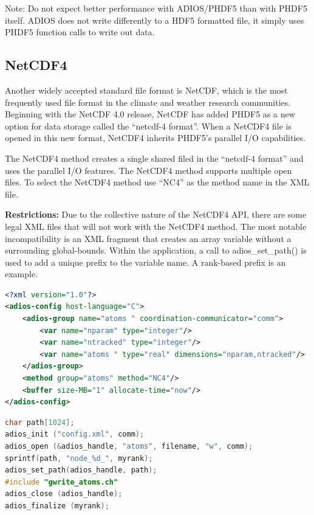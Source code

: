 Note: Do not expect better performance with ADIOS/PHDF5 than with PHDF5 itself. ADIOS does not write differently to a HDF5 formatted file, it simply uses PHDF5 function calls to write out data. 


\subsection{NetCDF4}

Another widely accepted standard file format is NetCDF, which is the most frequently 
used file format in the climate and weather research communities.  Beginning with 
the NetCDF 4.0 release, NetCDF has added PHDF5 as a new option for data storage 
called the ``netcdf-4 format''.  When a NetCDF4 file is opened in this new format, 
NetCDF4 inherits PHDF5's parallel I/O capabilities.

The NetCDF4 method creates a single shared filed in the ``netcdf-4 format'' and 
uses the parallel I/O features.  The NetCDF4 method supports multiple open files. 
 To select the NetCDF4 method use ``NC4'' as the method name in the XML file.

\textbf{Restrictions:} Due to the collective nature of the NetCDF4 API, there are 
some legal XML files that will not work with the NetCDF4 method.  The most notable 
incompatibility is an XML fragment that creates an array variable without a surrounding 
global-bounds.  Within the application, a call to adios\_set\_path() is used to 
add a unique prefix to the variable name.  A rank-based prefix is an example. 

\begin{lstlisting}[language=XML, caption=Example XML]
<?xml version="1.0"?> 
<adios-config host-language="C">
	<adios-group name="atoms " coordination-communicator="comm"> 
		<var name="nparam" type="integer"/>
		<var name="ntracked" type="integer"/>
		<var name="atoms " type="real" dimensions="nparam,ntracked"/> 
	</adios-group>
	<method group="atoms" method="NC4"/> 
	<buffer size-MB="1" allocate-time="now"/> 
</adios-config>
\end{lstlisting}

\begin{lstlisting}[language=C, caption=Example C source]
char path[1024];
adios_init ("config.xml", comm);
adios_open (&adios_handle, "atoms", filename, "w", comm); 
sprintf(path, "node_%d_", myrank); 
adios_set_path(adios_handle, path);
#include "gwrite_atoms.ch" 
adios_close (adios_handle); 
adios_finalize (myrank);
\end{lstlisting}

